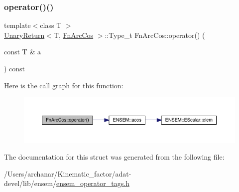 \subsubsection{\texorpdfstring{operator()()}{operator()()}\hspace{0.1cm}{\footnotesize\ttfamily [3/3]}}
{\footnotesize\ttfamily template$<$class T $>$ \\
\mbox{\hyperlink{structUnaryReturn}{Unary\+Return}}$<$T, \mbox{\hyperlink{structFnArcCos}{Fn\+Arc\+Cos}} $>$\+::Type\+\_\+t Fn\+Arc\+Cos\+::operator() (\begin{DoxyParamCaption}\item[{const T \&}]{a }\end{DoxyParamCaption}) const\hspace{0.3cm}{\ttfamily [inline]}}

Here is the call graph for this function\+:
\nopagebreak
\begin{figure}[H]
\begin{center}
\leavevmode
\includegraphics[width=350pt]{d1/d0b/structFnArcCos_a1485eed840820589bafab9b8cc21c43d_cgraph}
\end{center}
\end{figure}


The documentation for this struct was generated from the following file\+:\begin{DoxyCompactItemize}
\item 
/\+Users/archanar/\+Kinematic\+\_\+factor/adat-\/devel/lib/ensem/\mbox{\hyperlink{adat-devel_2lib_2ensem_2ensem__operator__tags_8h}{ensem\+\_\+operator\+\_\+tags.\+h}}\end{DoxyCompactItemize}
